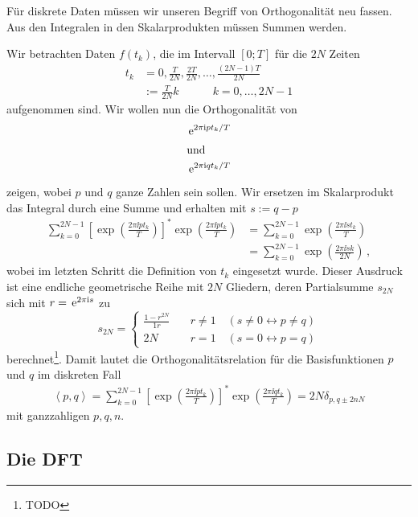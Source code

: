 \documentclass[paper=a4, fontsize=11.0pt, abstractoff, DIV12]{scrartcl}
\begin{document}
Für diskrete Daten müssen wir unseren Begriff von Orthogonalität neu fassen.
Aus den Integralen in den Skalarprodukten müssen Summen werden.

Wir betrachten Daten $f(t_k)$, die im Intervall $[0;T]$ für die $2N$ Zeiten
\begin{align}
t_k &= 0, \frac{T}{2N}, \frac{2T}{2N},\dots,\frac{(2N-1)T}{2N}\nonumber\\
&:=\frac{T}{2N}k\qquad\quad k=0,\dots,2N-1
\end{align}
aufgenommen sind. Wir wollen nun die Orthogonalität von
\begin{align*}
\,{\mathrm{e}}^{2\pi \mathrm{i} p t_k/T}\\
\intertext{und}
\,{\mathrm{e}}^{2\pi \mathrm{i} q t_k/T}
\end{align*}
zeigen, wobei $p$ und $q$ ganze Zahlen sein sollen. Wir ersetzen im Skalarprodukt
das Integral durch eine Summe und erhalten mit $s:=q-p$
\begin{align}
\sum\limits_{k=0}^{2N-1}\left[\exp{\left(\frac{2\pi\ii pt_k}{T}\right)} \right]^* \exp{\left(\frac{2\pi\ii pt_k}{T}\right)} &= \sum\limits_{k=0}^{2N-1}\exp{\left(\frac{2\pi\ii st_k}{T}\right)}\\
&=\sum\limits_{k=0}^{2N-1}\exp{\left(\frac{2\pi\ii sk}{2N}\right)}\,,
\end{align}
wobei im letzten Schritt die Definition von $t_k$ eingesetzt wurde. Dieser
Ausdruck ist eine endliche geometrische Reihe mit $2N$ Gliedern, deren
Partialsumme $s_{2N}$ sich mit $r=\,{\mathrm{e}}^{2\pi\mathrm{i} s}$ zu
\begin{equation}
s_{2N} = \left\{ \begin{array}{lr}\frac{1-r^{2N}}{1r}  & \quad r\ne 1\quad (s\ne 0 \leftrightarrow p \ne q)\\2N &\quad r=1\quad(s = 0 \leftrightarrow p = q)\end{array}\right.
\end{equation}
berechnet\footnote{TODO}. Damit lautet die Orthogonalitätsrelation für die
Basisfunktionen $p$ und $q$ im diskreten Fall
\begin{align}
\left<p,q\right>=\sum\limits_{k=0}^{2N-1} \left[\exp\left(\frac{2\pi\ii pt_k}{T}\right)\right]^*\exp\left(\frac{2\pi\ii qt_k}{T}\right) = 2N\delta_{p,q\pm 2nN}
\label{eq:diskOrth}
\end{align}
mit ganzzahligen $p,q,n$.

\subsection{Die DFT}
\end{document}
